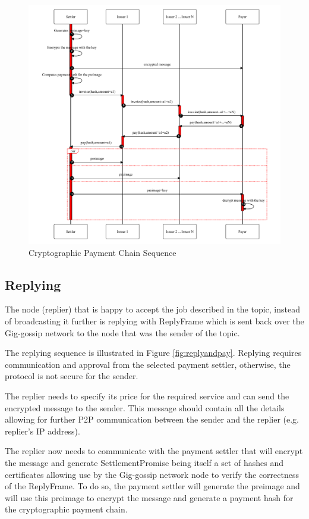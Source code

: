 \documentclass{article}
\begin{document}
\begin{figure}
	\centering
	\includegraphics[scale=0.7]{PaymentChain.pdf}
	\caption{Cryptographic Payment Chain Sequence}
	\label{fig:cryptopaychain}
\end{figure}

 
\subsection{Replying}
The node (replier) that is happy to accept the job described in the topic, instead of broadcasting it further is replying with ReplyFrame which is sent back over the Gig-gossip network to the node that was the sender of the topic. 

The replying sequence is illustrated in Figure \ref{fig:replyandpay}. Replying requires communication and approval from the selected payment settler, otherwise, the protocol is not secure for the sender.

The replier needs to specify its price for the required service and can send the encrypted message to the sender. This message should contain all the details allowing for further P2P communication between the sender and the replier (e.g. replier's IP address).

The replier now needs to communicate with the payment settler that will encrypt the message and generate SettlementPromise being itself a set of hashes and certificates allowing use by the Gig-gossip network node to verify the correctness of the ReplyFrame. To do so, the payment settler will generate the preimage and will use this preimage to encrypt the message and generate a payment hash for the cryptographic payment chain. 
\end{document}
